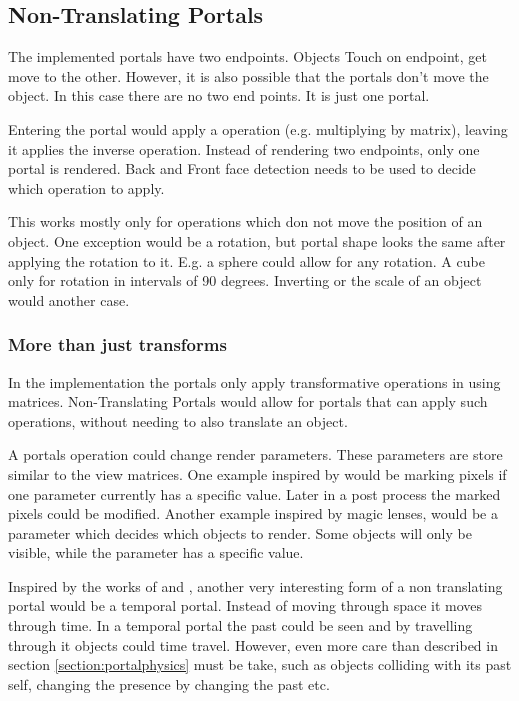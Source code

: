 \subsection{Non-Translating Portals}
The implemented portals have two endpoints. Objects Touch on endpoint, get move to the other. However, it is also possible that the portals don't move the object. In this case there are no two end points. It is just one portal.

Entering the portal would apply a operation (e.g. multiplying by matrix), leaving it applies the inverse operation. Instead of rendering two endpoints, only one portal is rendered. Back and Front face detection needs to be used to decide which operation to apply.

This works mostly only for operations which don not move the position of an object. One exception would be a rotation, but portal shape looks the same after applying the rotation to it. E.g. a sphere could allow for any rotation. A cube only for rotation in intervals of 90 degrees. Inverting or the scale of an object would another case.



\subsubsection{More than just transforms}

In the implementation the portals only apply transformative operations in using matrices. Non-Translating Portals would allow for portals that can apply such operations, without needing to also translate an object.

A portals operation could change render parameters. These parameters are store similar to the view matrices. One example inspired by \cite{borst:2009:real} would be marking pixels if one parameter currently has a specific value. Later in a post process the marked pixels could be modified. Another example inspired by magic lenses, would be a parameter which decides which objects to render. Some objects will only be visible, while the parameter has a specific value.

Inspired by the works of \textcite{ryall:2005:temporal} and \textcite{tiesel:2009:composable}, another very interesting form of a non translating portal would be a temporal portal. Instead of moving through space it moves through time. In a temporal portal the past could be seen and by travelling through it objects could time travel. However, even more care than described in section \ref{section:portalphysics} must be take, such as objects colliding with its past self, changing the presence by changing the past etc.






